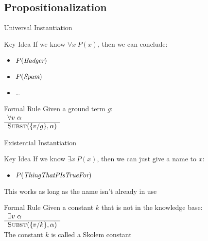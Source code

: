 \documentclass[12pt]{beamer}
\newcommand{\SC}[1]{\mbox{\sc#1}}
\newcommand{\EM}[1]{\mbox{\em#1}}
\begin{document}
\subsection{Propositionalization}
\begin{frame}{Universal Instantiation}
	\begin{block}{Key Idea}
		If we know $\forall x\ P(x)$, then we can conclude: \\
		\begin{itemize}
			\item $P(\EM{Badger})$
			\item $P(\EM{Spam})$
			\item \ldots
		\end{itemize}
	\end{block}
	\pause
	\begin{block}{Formal Rule}
		Given a ground term $g$: \\[.5em]
		$
		\begin{array}{l}
		\forall v\ \alpha \\
		\hline
		\SC{Subst}(\{v/g\}, \alpha)
		\end{array}
		$
	\end{block}
\end{frame}
\begin{frame}{Existential Instantiation}
	\begin{block}{Key Idea}
		If we know $\exists x\ P(x)$, then we can just give a name to $x$: \\
		\begin{itemize}
			\item $P(\EM{ThingThatPIsTrueFor})$
		\end{itemize}
		This works as long as the name isn't already in use
	\end{block}
	\pause
	\begin{block}{Formal Rule}
		Given a constant $k$ that is not in the knowledge base: \\[.5em]
		$
		\begin{array}{l}
		\exists v\ \alpha \\
		\hline
		\SC{Subst}(\{v/k\}, \alpha)
		\end{array}
		$ \\[.5em]
		The constant $k$ is called a \alert{Skolem constant}
	\end{block}
\end{frame}
\end{document}
